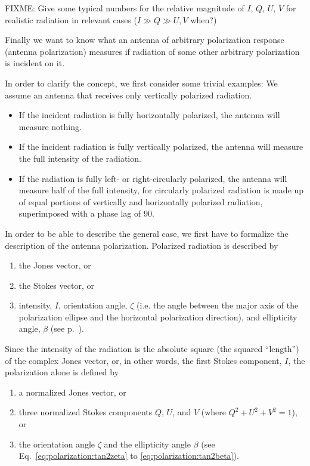 FIXME: Give some typical numbers for the relative magnitude of $I$,
$Q$, $U$, $V$
for realistic radiation in relevant cases ($I \gg Q \gg U,V$ when?)


\label{sec:polarization:antenna}
Finally we want to know what an antenna of arbitrary polarization
response (antenna polarization)
measures if radiation of some other arbitrary polarization is incident
on it.

In order to clarify the concept, we first consider some trivial examples:
We assume an antenna that receives only vertically polarized
radiation.
\begin{itemize}
\item If the incident radiation is fully horizontally polarized, the
  antenna will measure nothing.
\item If the incident radiation is fully vertically polarized, the
  antenna will measure the full intensity of the radiation.
\item If the radiation is fully left- or right-circularly polarized,
  the antenna will measure half of the full intensity, for circularly
  polarized radiation is made up of equal portions of vertically and
  horizontally polarized radiation, superimposed with a phase lag of
  90\degree.
\end{itemize}

In order to be able to describe the general case, we first have to
formalize the description of the antenna polarization.  Polarized
radiation is described by
\begin{enumerate}
\item 
the Jones vector, or 
\item the Stokes
vector, or
\item intensity, $I$, orientation angle, $\zeta$
(i.e. the angle between the major axis of the polarization ellipse and
the horizontal polarization direction), %
and ellipticity angle, $\beta$ (see
p.~\pageref{def:ellipticity-angle}).
\end{enumerate}
Since the intensity of the
radiation is the absolute square (the squared ``length'') of the
complex Jones vector, or, in other words, the first Stokes component,
$I$, the polarization alone is defined by
\begin{enumerate}
\item a normalized Jones
vector, or
\item three normalized Stokes components $Q$, $U$, and $V$
(where $Q^2 + U^2 + V^2 = 1$), or 
\item the orientation angle $\zeta$
and the ellipticity angle $\beta$ (see
Eq.~\ref{eq:polarization:tan2zeta} to \ref{eq:polarization:tan2beta}).
\end{enumerate}

